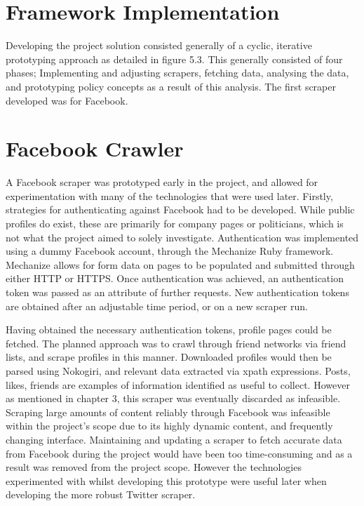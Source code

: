 \section{Framework Implementation}

Developing the project solution consisted generally of a cyclic, iterative prototyping approach as detailed in figure 5.3. This generally consisted of four phases; Implementing and adjusting scrapers, fetching data, analysing the data, and prototyping policy concepts as a result of this analysis. The first scraper developed was for Facebook. 


\section{Facebook Crawler}

A Facebook scraper was prototyped early in the project, and allowed for experimentation with many of the technologies that were used later. Firstly, strategies for authenticating against Facebook had to be developed. While public profiles do exist, these are primarily for company pages or politicians, which is not what the project aimed to solely investigate. Authentication was implemented using a dummy Facebook account, through the Mechanize Ruby framework. Mechanize allows for form data on pages to be populated and submitted through either HTTP or HTTPS. Once authentication was achieved, an authentication token was passed as an attribute of further requests. New authentication tokens are obtained after an adjustable time period, or on a new scraper run. 

Having obtained the necessary authentication tokens, profile pages could be fetched. The planned approach was to crawl through friend networks via friend lists, and scrape profiles in this manner. Downloaded profiles would then be parsed using Nokogiri, and relevant data extracted via xpath expressions. Posts, likes, friends are examples of information identified as useful to collect. However as mentioned in chapter 3, this scraper was eventually discarded as infeasible. Scraping large amounts of content reliably through Facebook was infeasible within the project's scope due to its highly dynamic content, and frequently changing interface. Maintaining and updating a scraper to fetch accurate data from Facebook during the project would have been too time-consuming and as a result was removed from the project scope. However the technologies experimented with whilst developing this prototype were useful later when developing the more robust Twitter scraper.


